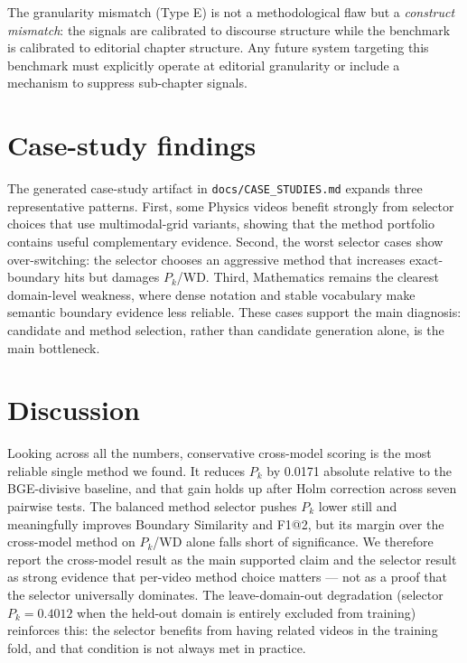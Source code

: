 The granularity mismatch (Type E) is not a methodological flaw but a
\emph{construct mismatch}: the signals are calibrated to discourse structure
while the benchmark is calibrated to editorial chapter structure.
Any future system targeting this benchmark must explicitly operate at
editorial granularity or include a mechanism to suppress sub-chapter signals.

\section{Case-study findings}
\label{sec:case_studies}

The generated case-study artifact in \texttt{docs/CASE\_STUDIES.md} expands
three representative patterns. First, some Physics videos benefit strongly from
selector choices that use multimodal-grid variants, showing that the method
portfolio contains useful complementary evidence. Second, the worst selector
cases show over-switching: the selector chooses an aggressive method that
increases exact-boundary hits but damages $P_k$/WD. Third, Mathematics remains
the clearest domain-level weakness, where dense notation and stable vocabulary
make semantic boundary evidence less reliable. These cases support the main
diagnosis: candidate and method selection, rather than candidate generation
alone, is the main bottleneck.



\section{Discussion}
\label{sec:discussion}

Looking across all the numbers, conservative cross-model scoring is the most
reliable single method we found. It reduces $P_k$ by 0.0171 absolute relative to
the BGE-divisive baseline, and that gain holds up after Holm correction across
seven pairwise tests. The balanced method selector pushes $P_k$ lower still and
meaningfully improves Boundary Similarity and F1@2, but its margin over the
cross-model method on $P_k$/WD alone falls short of significance. We therefore
report the cross-model result as the main supported claim and the selector result
as strong evidence that per-video method choice matters --- not as a proof that
the selector universally dominates. The leave-domain-out degradation (selector
$P_k=0.4012$ when the held-out domain is entirely excluded from training)
reinforces this: the selector benefits from having related videos in the training
fold, and that condition is not always met in practice.

